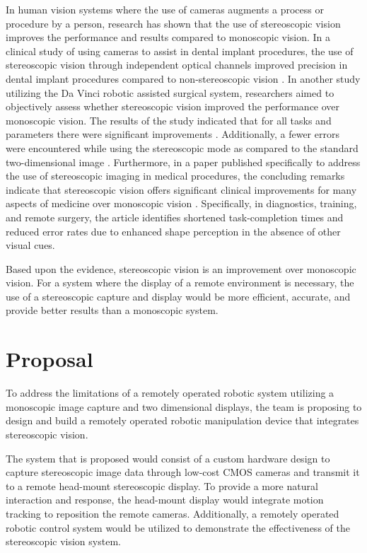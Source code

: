 \documentclass[12pt, journal]{IEEEtran}
\begin{document}
In human vision systems where the use of cameras augments a process or procedure by a person, research has shown that the use of stereoscopic vision improves the performance and results compared to monoscopic vision.  In a clinical study of using cameras to assist in dental implant procedures, the use of stereoscopic vision through independent optical channels improved precision in dental implant procedures compared to non-stereoscopic vision \cite{wanschitz}.  In another study utilizing the Da Vinci robotic assisted surgical system, researchers aimed to objectively assess whether stereoscopic vision improved the performance over monoscopic vision. The results of the study indicated that for all tasks and parameters there were significant improvements \cite{munz}. Additionally, a fewer errors were encountered while using the stereoscopic mode as compared to the standard two-dimensional image \cite{munz}.  Furthermore, in a paper published specifically to address the use of stereoscopic imaging in medical procedures, the concluding remarks indicate that stereoscopic vision offers significant clinical improvements for many aspects of medicine over monoscopic vision \cite{held}.  Specifically, in diagnostics, training, and remote surgery, the article identifies shortened task-completion times and reduced error rates due to enhanced shape perception in the absence of other visual cues.

Based upon the evidence, stereoscopic vision is an improvement over monoscopic vision.  For a system where the display of a remote environment is necessary, the use of a stereoscopic capture and display would be more efficient, accurate, and provide better results than a monoscopic system.



\section{Proposal}
To address the limitations of a remotely operated robotic system utilizing a monoscopic image capture and two dimensional displays, the team is proposing to design and build a remotely operated robotic manipulation device that integrates stereoscopic vision.

The system that is proposed would consist of a custom hardware design to capture stereoscopic image data through low-cost CMOS cameras and transmit it to a remote head-mount stereoscopic display.  To provide a more natural interaction and response, the head-mount display would integrate motion tracking to reposition the remote cameras.  Additionally, a remotely operated robotic control system would be utilized to demonstrate the effectiveness of the stereoscopic vision system.
\end{document}
